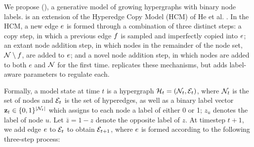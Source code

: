 \documentclass[aps,pre,reprint,superscriptaddress,nofootinbib]{revtex4-2}
\begin{document}
    We propose \Model{} (\model{}), a generative model of growing hypergraphs with binary node labels. 
    \model{} is an extension of the Hyperedge Copy Model (HCM) of He et al. \cite{heEdgeCorrelationsLink2025}. 
    In the HCM, a new edge $e$ is formed through a combination of three distinct steps: a copy step, in which a previous edge $f$ is sampled and imperfectly copied into $e$; an extant node addition step, in which nodes in the remainder of the node set, $\mathcal{N} \setminus f$, are added to $e$; and a novel node addition step, in which nodes are added to both $e$ and $\mathcal{N}$ for the first time.
    \model{} replicates these mechanisms, but adds label-aware parameters to regulate each. 

    Formally, a \model{} model state at time $t$ is a hypergraph $\mathcal{H}_{t} = \left( \mathcal{N}_{t}, \mathcal{E}_{t} \right)$, where $\mathcal{N}_{t}$ is the set of nodes and $\mathcal{E}_{t}$ is the set of hyperedges, as well as a binary label vector $\mathbf{z}_{t} \in \{0, 1\}^{|\mathcal{N}_{t}|}$ which assigns to each node a label of either 0 or 1; $z_u$ denotes the label of node $u$.
    Let $\bar{z} = 1 - z$ denote the opposite label of $z$.
    At timestep $t+1$, we add edge $e$ to $\mathcal{E}_{t}$ to obtain $\mathcal{E}_{t+1}$, where $e$ is formed according to the following three-step process:
\end{document}
